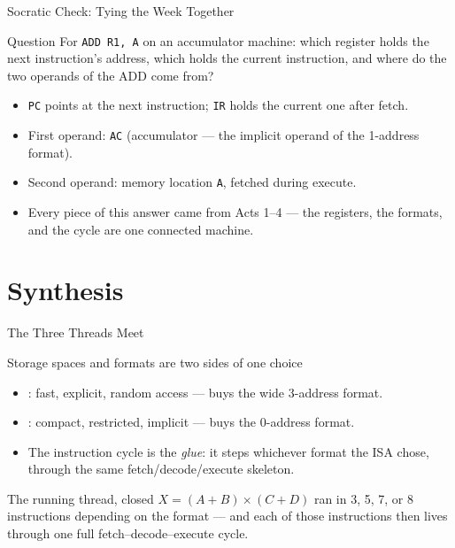 \documentclass[aspectratio=169]{beamer}
\begin{document}
\begin{frame}{Socratic Check: Tying the Week Together}
  \begin{alertblock}{Question}
    For \texttt{ADD R1, A} on an accumulator machine: which register holds the
    next instruction's address, which holds the current instruction, and where
    do the two operands of the ADD come from?
  \end{alertblock}
  \begin{itemize}
    \item \texttt{PC} points at the next instruction; \texttt{IR} holds the
      current one after fetch.
    \item First operand: \texttt{AC} (accumulator --- the implicit operand of
      the 1-address format).
    \item Second operand: memory location \texttt{A}, fetched during execute.
    \item Every piece of this answer came from Acts 1--4 --- the registers, the
      formats, and the cycle are one connected machine.
  \end{itemize}
\end{frame}

\section{Synthesis}


\begin{frame}{The Three Threads Meet}
  \begin{block}{Storage spaces and formats are two sides of one choice}
    \begin{itemize}
      \item {}: fast, explicit, random access --- buys the wide
        3-address format.
      \item {}: compact, restricted, implicit --- buys the 0-address
        format.
      \item The instruction cycle is the \emph{glue}: it steps whichever format
        the ISA chose, through the same fetch/decode/execute skeleton.
    \end{itemize}
  \end{block}
  \begin{exampleblock}{The running thread, closed}
    $X = (A+B)\times(C+D)$ ran in 3, 5, 7, or 8 instructions depending on the
    format --- and each of those instructions then lives through one full
    fetch--decode--execute cycle.
  \end{exampleblock}
\end{frame}
\end{document}
